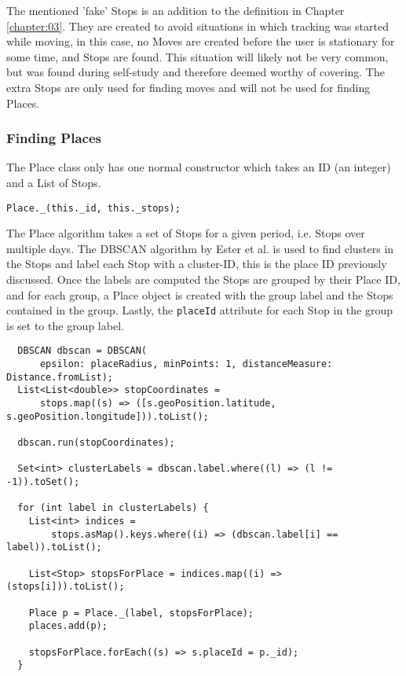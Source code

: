 The mentioned 'fake' Stops is an addition to the definition in Chapter \ref{chapter:03}. They are created to avoid situations in which tracking was started while moving, in this case, no Moves are created before the user is stationary for some time, and Stops are found. This situation will likely not be very common, but was found during self-study and therefore deemed worthy of covering. The extra Stops are only used for finding moves and will not be used for finding Places.

\subsubsection{Finding Places}
The Place class only has one normal constructor which takes an ID (an integer) and a List of Stops. 
\begin{verbatim}
Place._(this._id, this._stops);
\end{verbatim}

The Place algorithm takes a set of Stops for a given period, i.e. Stops over multiple days. The DBSCAN algorithm by Ester et al. \cite{density-based-1996} is used to find clusters in the Stops and label each Stop with a cluster-ID, this is the place ID previously discussed. Once the labels are computed the Stops are grouped by their Place ID, and for each group, a Place object is created with the group label and the Stops contained in the group. Lastly, the \verb|placeId| attribute for each Stop in the group is set to the group label.

\begin{verbatim}
  DBSCAN dbscan = DBSCAN(
      epsilon: placeRadius, minPoints: 1, distanceMeasure: Distance.fromList);
  List<List<double>> stopCoordinates =
      stops.map((s) => ([s.geoPosition.latitude, s.geoPosition.longitude])).toList();

  dbscan.run(stopCoordinates);

  Set<int> clusterLabels = dbscan.label.where((l) => (l != -1)).toSet();

  for (int label in clusterLabels) {
    List<int> indices =
        stops.asMap().keys.where((i) => (dbscan.label[i] == label)).toList();

    List<Stop> stopsForPlace = indices.map((i) => (stops[i])).toList();

    Place p = Place._(label, stopsForPlace);
    places.add(p);

    stopsForPlace.forEach((s) => s.placeId = p._id);
  }
\end{verbatim}


